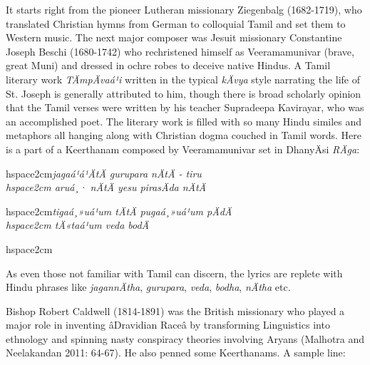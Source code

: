 It starts right from the pioneer Lutheran missionary Ziegenbalg (1682-1719), who translated Christian hymns from German to colloquial Tamil and set them to Western music. The next major composer was Jesuit missionary Constantine Joseph Beschi (1680-1742) who rechristened himself as Veeramamunivar (brave, great Muni) and dressed in ochre robes to deceive native Hindus. A Tamil literary work \textit{TÄmpÄvaá¹i }written in the typical \textit{kÄvya} style narrating the life of St. Joseph is generally attributed to him, though there is broad scholarly opinion that the Tamil verses were written by his teacher Supradeepa Kavirayar, who was an accomplished poet. The literary work is filled with so many Hindu similes and metaphors all hanging along with Christian dogma couched in Tamil words. Here is a part of a Keerthanam composed by Veeramamunivar set in DhanyÄsi \textit{RÄga}:

\begin{myquote}
hspace{2cm}\textit{jagaá¹á¹ÄtÄ gurupara nÄtÄ - tiru \\hspace{2cm} aruá¸· nÄtÄ yesu pirasÄda nÄtÄ }
\end{myquote}

\begin{myquote}
hspace{2cm}\textit{tigaá¸»uá¹um tÄtÄ pugaá¸»uá¹um pÄdÄ\\hspace{2cm} tÄ«taá¹um veda bodÄ}
\end{myquote}

\begin{myquote}
hspace{2cm}
\end{myquote}

As even those not familiar with Tamil can discern, the lyrics are replete with Hindu phrases like \textit{jagannÄtha}, \textit{gurupara}, \textit{veda}, \textit{bodha}, \textit{nÄtha} etc.

Bishop Robert Caldwell (1814-1891) was the British missionary who played a major role in inventing âDravidian Raceâ by transforming Linguistics into ethnology and spinning nasty conspiracy theories involving Aryans (Malhotra and Neelakandan 2011: 64-67). He also penned some Keerthanams. A sample line:

